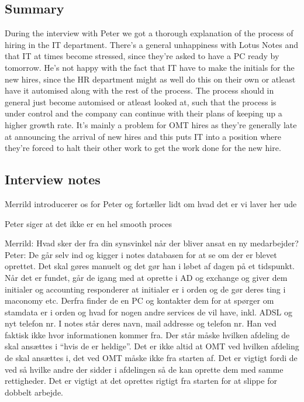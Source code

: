 \label{app:peter}
\subsection{Summary}
During the interview with Peter we got a thorough explanation of the process of hiring in the IT department. 
There's a general unhappiness with Lotus Notes and that IT at times become stressed, since they're asked to have a PC ready by tomorrow. 
He's not happy with the fact that IT have to make the initials for the new hires, since the HR department might as well do this on their own or atleast have it automised along with the rest of the process. 
The process should in general just become automised or atleast looked at, such that the process is under control and the company can continue with their plans of keeping up a higher growth rate.
It's mainly a problem for OMT hires as they're generally late at announcing the arrival of new hires and this puts IT into a position where they're forced to halt their other work to get the work done for the new hire.

\subsection{Interview notes}
Merrild introducerer os for Peter og fortæller lidt om hvad det er vi laver her ude

Peter siger at det ikke er en hel smooth proces

Merrild: Hvad sker der fra din synsvinkel når der bliver ansat en ny medarbejder?
Peter: De går selv ind og kigger i notes databasen for at se om der er blevet oprettet. Det skal gøres manuelt og det gør han i løbet af dagen på et tidspunkt.
Når det er fundet, går de igang med at oprette i AD og exchange og giver dem initialer og accounting responderer at initialer er i orden og de gør deres ting i maconomy etc.
Derfra finder de en PC og kontakter dem for at spørger om stamdata er i orden og hvad for nogen andre services de vil have, inkl. ADSL og nyt telefon nr. 
I notes står deres navn, mail addresse og telefon nr. Han ved faktisk ikke hvor informationen kommer fra. Der står måske hvilken afdeling de skal ansættes i “hvis de er heldige”. Det er ikke altid at OMT ved hvilken afdeling de skal ansættes i, det ved OMT måske ikke fra starten af. Det er vigtigt fordi de ved så hvilke andre der sidder i afdelingen så de kan oprette dem med samme rettigheder.
Det er vigtigt at det oprettes rigtigt fra starten for at slippe for dobbelt arbejde. 

